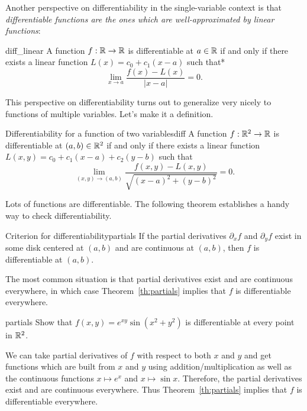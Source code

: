 \documentclass[svgnames]{watsonbook}
\begin{document}
  Another perspective on differentiability in the single-variable
  context is that \textit{differentiable functions are the ones which
    are well-approximated by linear functions}:

  \begin{theo}{}{diff_linear}
    A function $f: \mathbb{R} \to \mathbb{R}$ is differentiable at $a \in \mathbb{R}$ if and
    only if there exists a linear function $L(x) = c_0 + c_1(x-a) $
    such that* 
    \[
      \lim_{x \to a}\frac{f(x) - L(x)}{|x-a|} = 0. 
    \]
  \end{theo}

  This perspective on differentiability turns out to generalize very
  nicely to functions of multiple variables. Let's make it a
  definition.

  \begin{defn}{Differentiability for a function of two variables}{diff}
    A function $f: \mathbb{R}^2 \to \mathbb{R}$ is differentiable at $(a,b) \in \mathbb{R}^2$
    if and only if there exists a linear function
    $L(x,y) = c_0 + c_{1}(x-a) + c_{2}(y-b)$ such that
    \[
      \lim_{(x,y) \to (a,b)}\frac{f(x,y) - L(x,y)}{\sqrt{(x-a)^2 + (y-b)^2}} = 0. 
    \]
  \end{defn}

  Lots of functions are differentiable. The following theorem
  establishes a handy way to check differentiability. 

  \begin{theo}{Criterion for differentiability}{partials} 
    If the partial derivatives $\partial_x f$ and $\partial_y f$ exist
    in some disk centered at $(a,b)$ and are continuous at $(a,b)$, then
    $f$ is differentiable at $(a,b)$. 
  \end{theo}

  The most common situation is that partial derivatives exist and are
  continuous everywhere, in which case Theorem~\ref{th:partials}
  implies that $f$ is differentiable everywhere.

  \begin{example}{}{partials}
    Show that $f(x,y) = e^{xy} \sin (x^2 + y^2)$ is differentiable at
    every point in $\mathbb{R}^2$. 
  \end{example}

  \begin{solution}
    We can take partial derivatives of $f$ with respect to both $x$
    and $y$ and get functions which are built from $x$ and $y$ using
    addition/multiplication as well as the continuous functions
    $x\mapsto e^x$ and $x\mapsto \sin x$. Therefore, the partial
    derivatives exist and are continuous everywhere. Thus
    Theorem~\ref{th:partials} implies that $f$ is differentiable
    everywhere. 
  \end{solution}
\end{document}
